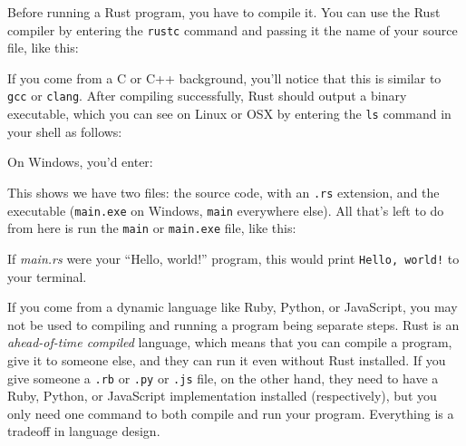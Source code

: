\documentclass[a4paper,]{book}
\newenvironment{Shaded}{\begin{snugshade}}{\end{snugshade}}
\newcommand{\KeywordTok}[1]{\textcolor[rgb]{0.13,0.29,0.53}{\textbf{{#1}}}}
\newcommand{\CommentTok}[1]{\textcolor[rgb]{0.56,0.35,0.01}{\textit{{#1}}}}
\newcommand{\NormalTok}[1]{{#1}}
\begin{document}
Before running a Rust program, you have to compile it. You can use the
Rust compiler by entering the \texttt{rustc} command and passing it the
name of your source file, like this:

\begin{Shaded}
\end{Shaded}

If you come from a C or C++ background, you'll notice that this is
similar to \texttt{gcc} or \texttt{clang}. After compiling successfully,
Rust should output a binary executable, which you can see on Linux or
OSX by entering the \texttt{ls} command in your shell as follows:

\begin{Shaded}
\end{Shaded}

On Windows, you'd enter:

\begin{Shaded}
\end{Shaded}

This shows we have two files: the source code, with an \texttt{.rs}
extension, and the executable (\texttt{main.exe} on Windows,
\texttt{main} everywhere else). All that's left to do from here is run
the \texttt{main} or \texttt{main.exe} file, like this:

\begin{Shaded}
\end{Shaded}

If \emph{main.rs} were your ``Hello, world!'' program, this would print
\texttt{Hello,\ world!} to your terminal.

If you come from a dynamic language like Ruby, Python, or JavaScript,
you may not be used to compiling and running a program being separate
steps. Rust is an \emph{ahead-of-time compiled} language, which means
that you can compile a program, give it to someone else, and they can
run it even without Rust installed. If you give someone a \texttt{.rb}
or \texttt{.py} or \texttt{.js} file, on the other hand, they need to
have a Ruby, Python, or JavaScript implementation installed
(respectively), but you only need one command to both compile and run
your program. Everything is a tradeoff in language design.
\end{document}
